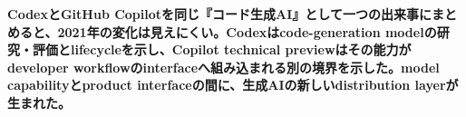 \noindent\textbf{CodexとGitHub Copilotを同じ『コード生成AI』として一つの出来事にまとめると、2021年の変化は見えにくい。Codexはcode-generation modelの研究・評価とlifecycleを示し、Copilot technical previewはその能力がdeveloper workflowのinterfaceへ組み込まれる別の境界を示した。model capabilityとproduct interfaceの間に、生成AIの新しいdistribution layerが生まれた。}\autocite{src-089fe2c6fbb1,src-47d0c87b08f0,src-5a992319f41e,src-890a73c0b288}
